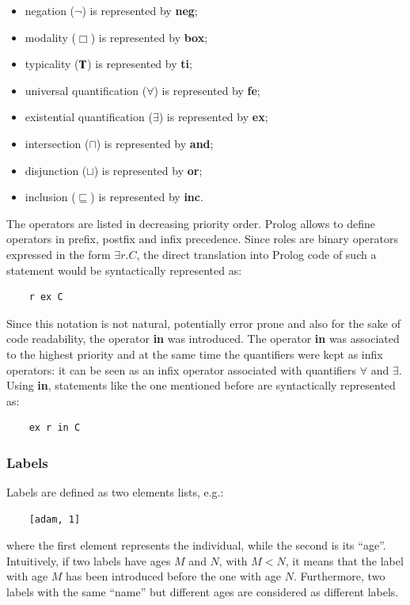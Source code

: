 \documentclass[a4paper, 11pt, oneside]{elsarticle}
\newcommand{\tip}{{\bf T}}
\newcommand{\perogni} {\forall}
\newcommand{\esiste} {\exists}
\begin{document}
\begin{itemize}
\item negation ($\neg$) is represented by \textbf{neg};
\item modality ($\Box$) is represented by \textbf{box};
\item typicality ($\tip$) is represented by \textbf{ti};
\item universal quantification ($\perogni$) is represented by \textbf{fe};
\item existential quantification ($\esiste$) is represented by \textbf{ex};
\item intersection ($\sqcap$) is represented by \textbf{and};
\item disjunction ($\sqcup$) is represented by \textbf{or};
\item inclusion ($\sqsubseteq$) is represented by \textbf{inc}.
\end{itemize}

The operators are listed in decreasing priority order.
Prolog allows to define operators in prefix, postfix and infix precedence.
Since roles are binary operators expressed in the form $\esiste r.C$, the direct translation into Prolog code of such a statement would be syntactically represented as:
\begin{verbatim}
    r ex C
\end{verbatim}
Since this notation is not natural, potentially error prone and also for the sake of code readability, the operator \textbf{in} was introduced.
The operator \textbf{in} was associated to the highest priority and at the same time the quantifiers were kept as infix operators: it can be seen as an infix operator associated with quantifiers $\perogni$ and $\esiste$.
Using \textbf{in}, statements like the one mentioned before are syntactically represented as:
\begin{verbatim}
    ex r in C
\end{verbatim}

\subsubsection{Labels}
Labels are defined as two elements lists, e.g.:
\begin{verbatim}
    [adam, 1]
\end{verbatim}
where the first element represents the individual, while the second is its ``age''.
Intuitively, if two labels have ages $M$ and $N$, with $M < N$, it means that the label with age $M$ has been introduced before the one with age $N$.
Furthermore, two labels with the same ``name'' but different ages are considered as different labels.\\
\end{document}
